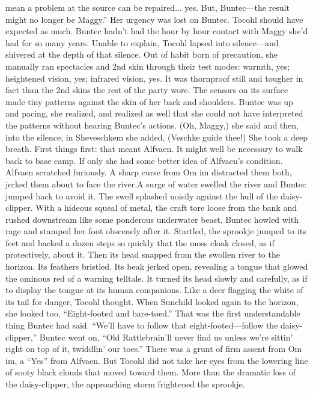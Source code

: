 \documentclass[9pt]{article}
\begin{document}
mean a problem at the source can be repaired... yes. But, Buntec—the result might no longer be
Maggy.”
Her urgency was lost on Buntec. Tocohl should have expected as much. Buntec hadn’t had the hour
by hour contact with Maggy she’d had for so many years. Unable to explain, Tocohl lapsed into
silence—and shivered at the depth of that silence.
Out of habit born of precaution, she manually ran spectacles and 2nd skin through their test modes:
warmth, yes; heightened vision, yes; infrared vision, yes.
It was thornproof still and tougher in fact than the 2nd skins the rest of the party wore. The sensors
on its surface made tiny patterns against the skin of her back and shoulders. Buntec was up and pacing,
she realized, and realized as well that she could not have interpreted the patterns without hearing
Buntec’s actions.
(Oh, Maggy,) she said and then, into the silence, in Sheveschkem she added, (Veschke guide thee!)
She took a deep breath. First things first: that meant Alfvaen. It might well be necessary to walk back to
base camp. If only she had some better idea of Alfvaen’s condition.
Alfvaen scratched furiously.
A sharp curse from Om im distracted them both, jerked them about to face the river.A surge of water swelled the river and Buntec jumped back to avoid it. The swell splashed noisily
against the hull of the daisy-clipper. With a hideous squeal of metal, the craft tore loose from the bank
and rushed downstream like some ponderous underwater beast. Buntec howled with rage and stamped
her foot obscenely after it.
Startled, the sprookje jumped to its feet and backed a dozen steps so quickly that the moss cloak
closed, as if protectively, about it. Then its head snapped from the swollen river to the horizon. Its
feathers bristled. Its beak jerked open, revealing a tongue that glowed the ominous red of a warning
telltale.
It turned its head slowly and carefully, as if to display the tongue at its human companions. Like a
deer flagging the white of its tail for danger, Tocohl thought. When Sunchild looked again to the horizon,
she looked too.
“Eight-footed and bare-toed.” That was the first understandable thing Buntec had said. “We’ll have
to follow that eight-footed—follow the daisy-clipper,” Buntec went on, “Old Rattlebrain’ll never find us
unless we’re sittin’ right on top of it, twiddlin’ our toes.”
There was a grunt of firm assent from Om im, a “Yes” from Alfvaen.
But Tocohl did not take her eyes from the lowering line of sooty black clouds that moved toward
them. More than the dramatic loss of the daisy-clipper, the approaching storm frightened the sprookje.
\end{document}
